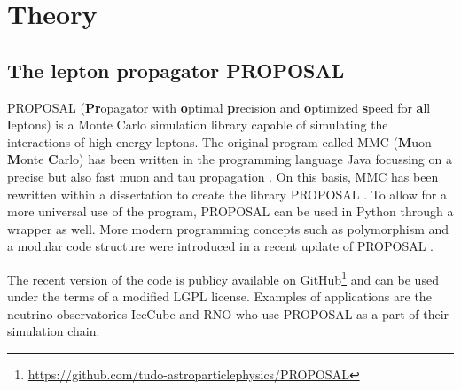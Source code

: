 \chapter{Theory}

\section{The lepton propagator PROPOSAL}

PROPOSAL (\textbf{Pr}opagator with \textbf{o}ptimal \textbf{p}recision and \textbf{o}ptimized \textbf{s}peed for \textbf{a}ll \textbf{l}eptons) is a Monte Carlo simulation library capable of simulating the interactions of high energy leptons.
The original program called MMC (\textbf{M}uon \textbf{M}onte \textbf{C}arlo) has been written in the programming language Java focussing on a precise but also fast muon and tau propagation \cite{chirkin2004propagating}.
On this basis, MMC has been rewritten within a dissertation to create the \CC library PROPOSAL \cite{Kohne:2013zbq}.
To allow for a more universal use of the program, PROPOSAL can be used in Python through a wrapper as well.
More modern programming concepts such as polymorphism and a modular code structure were introduced in a recent update of PROPOSAL \cite{dunsch_2018_proposal_improvements}.

The recent version of the code is publicy available on GitHub\footnote{\url{https://github.com/tudo-astroparticlephysics/PROPOSAL}} and can be used under the terms of a modified LGPL license.
Examples of applications are the neutrino observatories IceCube and RNO who use PROPOSAL as a part of their simulation chain.